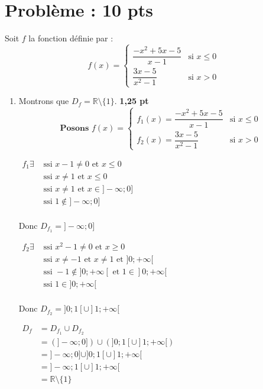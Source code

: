 \documentclass[12pt,a4paper]{article}
\begin{document}
\section*{Problème : 10 pts}

Soit \( f \) la fonction définie par :
\[
f(x) = 
\begin{cases}
\dfrac{-x^2 + 5x - 5}{x - 1} & \text{si } x \leq 0 \\
\dfrac{3x - 5}{x^2 - 1} & \text{si } x > 0
\end{cases}
\]

\begin{enumerate}
    \item Montrons que \( D_f = \mathbb{R} \setminus \{1\} \). \hfill \textbf{1{,}25 pt}
    \[\textbf{Posons }
f(x) = 
\begin{cases}
f_{1}(x)=\dfrac{-x^2 + 5x - 5}{x - 1} & \text{si } x \leq 0 \\
f_{2}(x)=\dfrac{3x - 5}{x^2 - 1} & \text{si } x > 0
\end{cases}
\]

\( 
\begin{aligned}
f_{1} \exists &\text{ ssi }  x - 1 \neq 0 \text{ et } x \leq 0\\
							&\text{ ssi }  x \neq 1 \text{ et } x \leq 0\\
							&\text{ ssi }  x \neq 1 \text{ et } x \in ]-\infty ; 0]\\
							&\text{ ssi }  1  \notin ]-\infty ; 0]\\
\end{aligned}
\)

Donc \( D_{f_{1}} = ]-\infty ; 0] \)

\( 
\begin{aligned}
f_{2} \exists &\text{ ssi }  x^{2} - 1 \neq 0 \text{ et } x \geq 0\\
							&\text{ ssi }  x \neq -1 \text{ et } x \neq 1 \text{ et } ]0 ;+\infty[\\
							&\text{ ssi }  -1  \notin ]0 ;+\infty[ \text{ et } 1  \in ]0 ;+\infty[\\
							&\text{ ssi }  1  \in ]0 ;+\infty[\\
\end{aligned}
\)

Donc \( D_{f_{2}} = ]0 ; 1[ \cup ]1;+\infty[ \)

\(
\begin{aligned}
D_f &= D_{f_1} \cup D_{f_2} \\
    &= (]-\infty ; 0]) \cup (]0 ; 1[ \cup ]1 ; +\infty[) \\
    &= ]-\infty ; 0] \cup ]0 ; 1[ \cup ]1 ; +\infty[ \\
    &= ]-\infty ; 1[ \cup ]1 ; +\infty[ \\
    &=\mathbb{R}\setminus\{1\}
\end{aligned}
\)


\end{enumerate}
\end{document}
